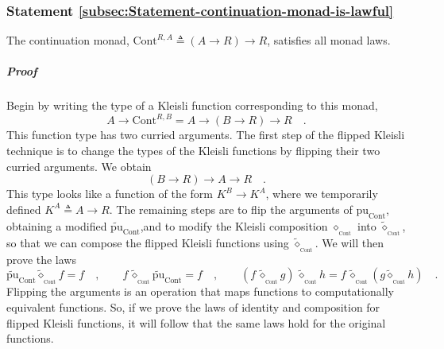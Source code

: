 \subsubsection{Statement \label{subsec:Statement-continuation-monad-is-lawful}\ref{subsec:Statement-continuation-monad-is-lawful}}

The continuation monad, $\text{Cont}^{R,A}\triangleq\left(A\rightarrow R\right)\rightarrow R$,
satisfies all monad laws.

\subparagraph{Proof}

Begin by writing the type of a Kleisli function corresponding to this
monad,
\[
A\rightarrow\text{Cont}^{R,B}=A\rightarrow\left(B\rightarrow R\right)\rightarrow R\quad.
\]
This function type has two curried arguments. The first step of the
flipped Kleisli technique is to change the types of the Kleisli functions
by flipping their two curried arguments. We obtain
\[
\left(B\rightarrow R\right)\rightarrow A\rightarrow R\quad.
\]
This type looks like a function of the form $K^{B}\rightarrow K^{A}$,
where we temporarily defined $K^{A}\triangleq A\rightarrow R$. The
remaining steps are to flip the arguments of $\text{pu}_{\text{Cont}}$,
obtaining a modified $\tilde{\text{pu}}_{\text{Cont}}$,and to modify
the Kleisli composition $\diamond_{_{\text{Cont}}}$ into $\tilde{\diamond}_{_{\text{Cont}}}$,
so that we can compose the flipped Kleisli functions using $\tilde{\diamond}_{_{\text{Cont}}}$.
We will then prove the laws
\[
\tilde{\text{pu}}_{\text{Cont}}\tilde{\diamond}_{_{\text{Cont}}}f=f\quad,\quad\quad f\,\tilde{\diamond}_{_{\text{Cont}}}\tilde{\text{pu}}_{\text{Cont}}=f\quad,\quad\quad(f\,\tilde{\diamond}_{_{\text{Cont}}}g)\,\tilde{\diamond}_{_{\text{Cont}}}h=f\,\tilde{\diamond}_{_{\text{Cont}}}(g\tilde{\diamond}_{_{\text{Cont}}}h)\quad.
\]
Flipping the arguments is an operation that maps functions to computationally
equivalent functions. So, if we prove the laws of identity and composition
for flipped Kleisli functions, it will follow that the same laws hold
for the original functions.

